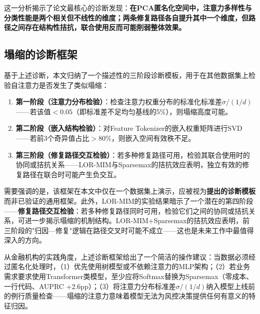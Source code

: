 这一分析揭示了论文最核心的诊断发现：\textbf{在PCA匿名化空间中，注意力多样性与分类性能是两个相关但不线性的维度；两条修复路径各自提升其中一个维度，但路径之间存在结构性拮抗，联合使用反而可能削弱整体效果。}

\subsection{塌缩的诊断框架}

基于上述诊断，本文归纳了一个描述性的三阶段诊断模板，用于在其他数据集上检验自注意力是否发生了类似塌缩：

\begin{enumerate}
    \item \textbf{第一阶段（注意力分布检验）}：检查注意力权重分布的标准化标准差$\sigma / (1/d)$——若该值$< 0.05$（即标准差不足均匀基线的5\%），则塌缩高度可能。
    \item \textbf{第二阶段（嵌入结构检验）}：对Feature Tokenizer的嵌入权重矩阵进行SVD——若前3个奇异值占比$> 80\%$，则嵌入空间有效秩不足。
    \item \textbf{第三阶段（修复路径交互检验）}：若多种修复路径可用，检验其联合使用时的协同或拮抗关系——LOR-MIM与Sparsemax的拮抗效应表明，独立有效的修复路径在联合时可能产生负交互。
\end{enumerate}

需要强调的是，该框架在本文中仅在一个数据集上演示，应被视为\textbf{提出的诊断模板}而非已验证的通用框架。此外，LOR-MIM的实验结果暗示了一个潜在的第四阶段——\textbf{修复路径交互检验}：若多种修复路径同时可用，检验它们之间的协同或拮抗关系，可进一步揭示塌缩的机制结构。LOR-MIM+Sparsemax的拮抗效应表明，前三阶段的"归因—修复"逻辑在路径交叉时可能不成立——这也是未来工作中最值得深入的方向。

从金融机构的实践角度，上述诊断框架给出了一个简洁的操作建议：当数据必须经过匿名化处理时，（1）优先使用树模型或不依赖注意力的MLP架构；（2）若业务需求要求使用Transformer类模型，至少应将Softmax替换为Sparsemax（零成本、一行代码、AUPRC +2.6pp）；（3）将注意力分布标准差$\sigma/(1/d)$纳入模型上线前的例行质量检查——塌缩的注意力意味着模型无法为风控决策提供任何有意义的特征归因。
